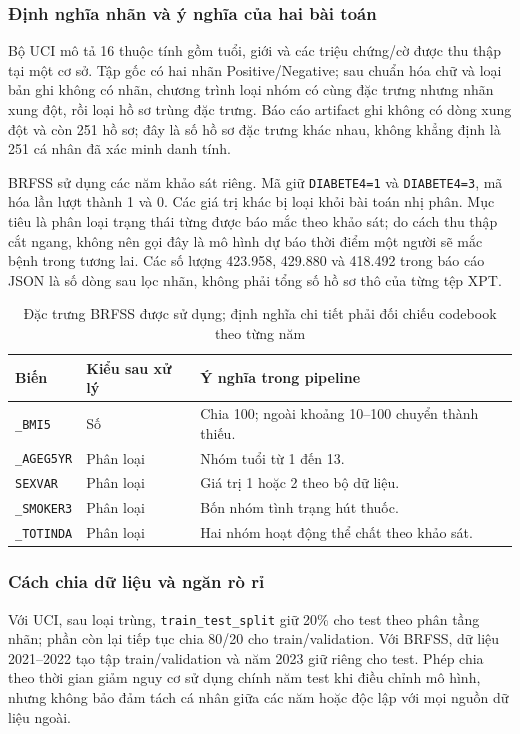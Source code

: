 \subsubsection{Định nghĩa nhãn và ý nghĩa của hai bài toán}
Bộ UCI mô tả 16 thuộc tính gồm tuổi, giới và các triệu chứng/cờ được thu thập tại một cơ sở. Tập gốc có hai nhãn Positive/Negative; sau chuẩn hóa chữ và loại bản ghi không có nhãn, chương trình loại nhóm có cùng đặc trưng nhưng nhãn xung đột, rồi loại hồ sơ trùng đặc trưng. Báo cáo artifact ghi không có dòng xung đột và còn 251 hồ sơ; đây là số hồ sơ đặc trưng khác nhau, không khẳng định là 251 cá nhân đã xác minh danh tính.

BRFSS sử dụng các năm khảo sát riêng. Mã giữ \texttt{DIABETE4=1} và \texttt{DIABETE4=3}, mã hóa lần lượt thành 1 và 0. Các giá trị khác bị loại khỏi bài toán nhị phân. Mục tiêu là phân loại trạng thái từng được báo mắc theo khảo sát; do cách thu thập cắt ngang, không nên gọi đây là mô hình dự báo thời điểm một người sẽ mắc bệnh trong tương lai. Các số lượng 423.958, 429.880 và 418.492 trong báo cáo JSON là số dòng sau lọc nhãn, không phải tổng số hồ sơ thô của từng tệp XPT.
\begin{table}[H]\centering\small\begin{tabular}{llp{7.2cm}}\toprule
Biến & Kiểu sau xử lý & Ý nghĩa trong pipeline\\\midrule
\texttt{\_BMI5} & Số & Chia 100; ngoài khoảng 10--100 chuyển thành thiếu.\\
\texttt{\_AGEG5YR} & Phân loại & Nhóm tuổi từ 1 đến 13.\\
\texttt{SEXVAR} & Phân loại & Giá trị 1 hoặc 2 theo bộ dữ liệu.\\
\texttt{\_SMOKER3} & Phân loại & Bốn nhóm tình trạng hút thuốc.\\
\texttt{\_TOTINDA} & Phân loại & Hai nhóm hoạt động thể chất theo khảo sát.\\\bottomrule\end{tabular}\caption{Đặc trưng BRFSS được sử dụng; định nghĩa chi tiết phải đối chiếu codebook theo từng năm}\end{table}
\subsubsection{Cách chia dữ liệu và ngăn rò rỉ}
Với UCI, sau loại trùng, \texttt{train\_test\_split} giữ 20\% cho test theo phân tầng nhãn; phần còn lại tiếp tục chia 80/20 cho train/validation. Với BRFSS, dữ liệu 2021--2022 tạo tập train/validation và năm 2023 giữ riêng cho test. Phép chia theo thời gian giảm nguy cơ sử dụng chính năm test khi điều chỉnh mô hình, nhưng không bảo đảm tách cá nhân giữa các năm hoặc độc lập với mọi nguồn dữ liệu ngoài.

